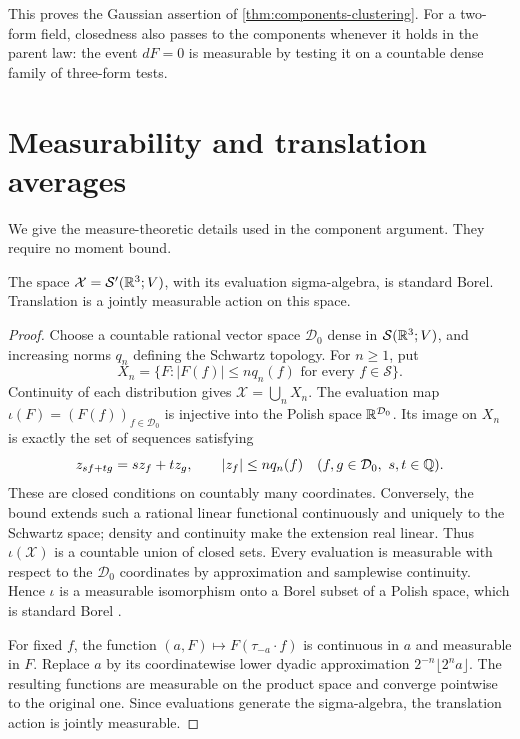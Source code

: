 This proves the Gaussian assertion of
\cref{thm:components-clustering}. For a two-form field, closedness
also passes to the components whenever it holds in the parent law:
the event $dF=0$ is measurable by testing it on a countable dense
family of three-form tests.
\appendix
\section{Measurability and translation averages}\label{sec:background}
We give the measure-theoretic details used in the component argument.
They require no moment bound.

\begin{lemma}\label{lem:standard-borel}
The space \(\mathcal X=\mathcal S'(\mathbb R^3;V)\), with its evaluation
sigma-algebra, is standard Borel. Translation is a jointly measurable
action on this space.
\end{lemma}
\begin{proof}
Choose a countable rational vector space \(\mathcal D_0\) dense in
\(\mathcal S(\mathbb R^3;V)\), and increasing norms \(q_n\) defining the
Schwartz topology. For \(n\ge1\), put
\[
 X_n=\{F:|F(f)|\le n q_n(f)\text{ for every }f\in\mathcal S\}.
\]
Continuity of each distribution gives \(\mathcal X=\bigcup_nX_n\).
The evaluation map
\(\iota(F)=(F(f))_{f\in\mathcal D_0}\) is injective into the
Polish space \(\mathbb R^{\mathcal D_0}\).
Its image on \(X_n\) is exactly the set of sequences satisfying
\[
 z_{sf+tg}=sz_f+tz_g,\qquad |z_f|\le n q_n(f)
 \quad(f,g\in\mathcal D_0,\ s,t\in\mathbb Q).
\]
These are closed conditions on countably many coordinates.
Conversely, the bound extends such a rational linear functional
continuously and uniquely to the Schwartz space; density and
continuity make the extension real linear.
Thus \(\iota(\mathcal X)\) is a countable union of closed sets.
Every evaluation is measurable with respect to the
\(\mathcal D_0\) coordinates by approximation and samplewise
continuity. Hence \(\iota\) is a measurable isomorphism onto a
Borel subset of a Polish space, which is standard Borel
\cite[Theorem~2.1.22]{Durrett2019}.

For fixed \(f\), the function
\((a,F)\mapsto F(\tau_{-a}\cdot f)\) is continuous in \(a\) and
measurable in \(F\). Replace \(a\) by its coordinatewise lower
dyadic approximation \(2^{-n}\lfloor2^na\rfloor\).
The resulting functions are measurable on the product space and
converge pointwise to the original one. Since evaluations generate
the sigma-algebra, the translation action is jointly measurable.
\end{proof}

